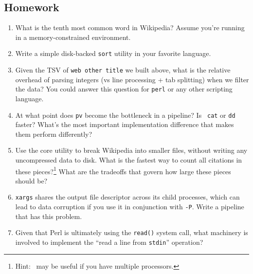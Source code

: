 \subsection{Homework}
\begin{enumerate}
  \item What is the tenth most common word in Wikipedia? Assume you're running
        in a memory-constrained environment.
  \item Write a simple disk-backed {\tt sort} utility in your favorite language.
  \item Given the TSV of {\tt web other title} we built above, what is the
        relative overhead of parsing integers (vs line processing + tab
        splitting) when we filter the data? You could answer this question for
        {\tt perl} or any other scripting language.
  \item At what point does {\tt pv} become the bottleneck in a pipeline? Is {\tt
        cat} or {\tt dd} faster? What's the most important implementation
        difference that makes them perform differently?
  \item Use the
        core utility to break Wikipedia into smaller files, without writing any
        uncompressed data to disk. What is the fastest way to count all
        citations in these pieces?\footnote{Hint:~ may be useful if you have multiple processors.} What are the
        tradeoffs that govern how large these pieces should be?
  \item {\tt xargs} shares the output file descriptor across its child
        processes, which can lead to data corruption if you use it in
        conjunction with {\tt -P}. Write a pipeline that has this problem.
  \item Given that Perl is ultimately using the {\tt read()} system call, what
        machinery is involved to implement the ``read a line from {\tt stdin}''
        operation?
\end{enumerate}
